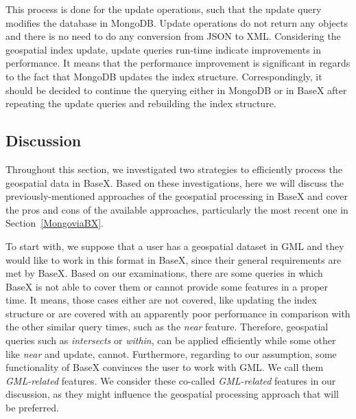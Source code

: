 \documentclass[a4paper,12pt]{article}
\begin{document}


This process is done for the update operations, such that the update query modifies the database in MongoDB. Update operations do not return any objects and there is no need to do any conversion from JSON to XML. Considering the geo\-spatial index update, update queries run-time indicate improvements in performance. It means that the performance improvement is significant in regards to the fact that MongoDB updates the index structure. Correspondingly, it should be decided to continue the querying either in MongoDB or in BaseX after repeating the update queries and rebuilding the index structure. 



\subsection{Discussion}
\label{s.disc}
Throughout this section, we investigated two strategies to efficiently process the geospatial data in BaseX. Based on these investigations, here we will discuss the  previously-mentioned approaches of the geospatial processing in BaseX and cover the pros and cons of the available approaches, particularly the most recent one in Section~\ref{MongoviaBX}. 

To start with, we suppose that a user has a geospatial dataset in GML and they would like to work in this format in BaseX, since their general requirements are met by BaseX. Based on our examinations, there are some queries in which BaseX is not able to cover them or cannot provide some features in a proper time. It means, those cases either are not covered, like updating the index structure or are covered with an apparently poor performance in comparison with the other similar query times, such as the \textit{near} feature. Therefore, geospatial queries such as \textit{intersects} or \textit{within}, can be applied efficiently while some other like \textit{near} and update, cannot. Furthermore, regarding to our assumption, some functionality of BaseX convinces the user to work with GML. We call them \textit{GML-related} features. We consider these co-called \textit{GML-related} features in our discussion, as they might influence the geospatial processing approach that will be preferred.
\end{document}
